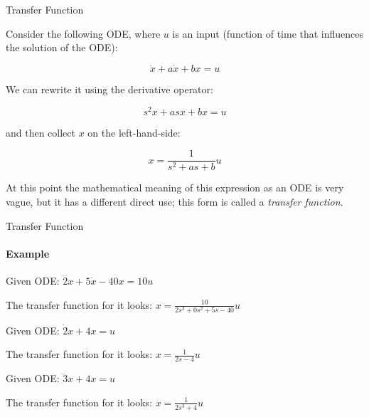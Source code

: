 \documentclass{beamer}
\begin{document}
\begin{frame}{Transfer Function}
\begin{flushleft}

Consider the following ODE, where $u$ is an input (function of time that influences the solution of the ODE):

\begin{equation}
\ddot x + a \dot x + b x = u
\end{equation}

We can rewrite it using the derivative operator:

\begin{equation}
s^2 x + a s x + b x = u
\end{equation}

and then collect $x$ on the left-hand-side:

\begin{equation}
x = \frac{1}{s^2 + a s + b} u
\end{equation}

At this point the mathematical meaning of this expression as an ODE is very vague, but it has a different direct use; this form is called a \emph{transfer function}.

\end{flushleft}
\end{frame}


\begin{frame}{Transfer Function}
\framesubtitle{Example}
\begin{flushleft}

\begin{example}
Given ODE: $\dddot 2x + 5\dot x - 40 x = 10 u$

The transfer function for it looks: 
$x = \frac{10}{2 s^3 + 0 s^2 + 5 s - 40} u$
\end{example}


\begin{example}
Given ODE: $\dot 2x+ 4 x = u$

The transfer function for it looks: $x = \frac{1}{2 s - 4} u$
\end{example}


\begin{example}
Given ODE: $\dddot 3x + 4x = u$

The transfer function for it looks: $x = \frac{1}{2 s^3 + 4} u$
\end{example}

\end{flushleft}
\end{frame}
\end{document}
